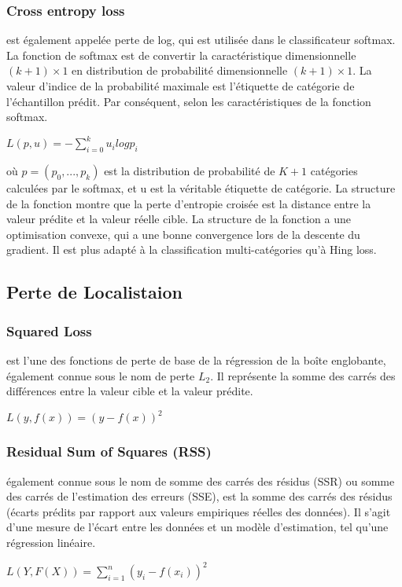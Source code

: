           \subsubsection{Cross entropy loss}
          est également appelée perte de log, qui est utilisée dans le classificateur softmax. La fonction de softmax est de convertir la caractéristique dimensionnelle $(k+1)\times1$ en distribution de probabilité dimensionnelle $(k+1)\times1$. La valeur d'indice de la probabilité maximale est l'étiquette de catégorie de l'échantillon prédit. Par conséquent, selon les caractéristiques de la fonction softmax.
          \begin{center} $L(p,u)=-\sum_{i=0}^{k}u_i log p_i$ \end{center}
          où $p=(p_0,..., p_k)$ est la distribution de probabilité de $K+1$ catégories calculées par le softmax, et u est la véritable étiquette de catégorie. La structure de la fonction montre que la perte d'entropie croisée est la distance entre la valeur prédite et la valeur réelle cible. La structure de la fonction a une optimisation convexe, qui a une bonne convergence lors de la descente du gradient. Il est plus adapté à la classification multi-catégories qu'à Hing loss.

     \subsection{Perte de Localistaion}
          \subsubsection{Squared Loss}
          est l'une des fonctions de perte de base de la régression de la boîte englobante, également connue sous le nom de perte $L_2$. Il représente la somme des carrés des différences entre la valeur cible et la valeur prédite.
          \begin{center} $L(y, f(x)) = (y - f(x))^2$ \end{center}

          \subsubsection{Residual Sum of Squares (RSS)}
          également connue sous le nom de somme des carrés des résidus (SSR) ou somme des carrés de l'estimation des erreurs (SSE), est la somme des carrés des résidus (écarts prédits par rapport aux valeurs empiriques réelles des données). Il s'agit d'une mesure de l'écart entre les données et un modèle d'estimation, tel qu'une régression linéaire.
          \begin{center} $L(Y, F(X)) = \sum_{i=1}^{n}(y_i - f(x_i))^2$ \end{center}

